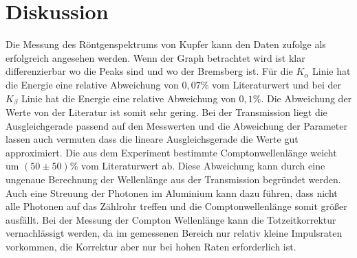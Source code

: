 \section{Diskussion}
\label{sec:Diskussion}
Die Messung des Röntgenspektrums von Kupfer kann den Daten zufolge als erfolgreich angesehen werden.
Wenn der Graph betrachtet wird ist klar differenzierbar wo die Peaks sind und wo der Bremsberg ist.
Für die $K_{\alpha}$ Linie hat die Energie eine relative Abweichung von $0,07\%$ vom Literaturwert und bei der $K_{\beta}$ Linie hat die Energie eine relative Abweichung von $0,1\%$.
Die Abweichung der Werte von der Literatur \cite{CuLit} ist somit sehr gering.
Bei der Transmission liegt die Ausgleichgerade passend auf den Messwerten und die Abweichung der Parameter lassen auch vermuten dass die lineare Ausgleichsgerade die Werte gut approximiert.
Die aus dem Experiment bestimmte Comptonwellenlänge weicht um $(50\pm50)\%$ vom Literaturwert \cite{Lit} ab.
Diese Abweichung kann durch eine ungenaue Berechnung der Wellenlänge aus der Transmission begründet werden.
Auch eine Streuung der Photonen im Aluminium kann dazu führen, dass nicht alle Photonen auf das Zählrohr treffen und die Comptonwellenlänge somit größer ausfällt.
Bei der Messung der Compton Wellenlänge kann die Totzeitkorrektur vernachlässigt werden, da im gemessenen Bereich nur relativ kleine Impulsraten vorkommen, die Korrektur aber nur bei hohen Raten erforderlich ist.


